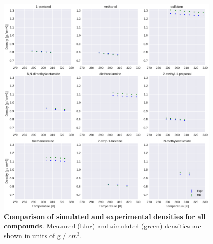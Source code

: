\documentclass[aip, jcp, reprint]{revtex4-1}  %
\begin{document}
\begin{figure}[alldensity]

\ContinuedFloat

\includegraphics[width=\textwidth]{./figures/densities_versus_temperature_part2.pdf}

\caption{{\bf Comparison of simulated and experimental densities for all compounds.} 
Measured (blue) and simulated (green) densities are shown in units of g / $cm^{3}$.
\label{figure:AllDensities}
}

\end{figure}
\end{document}

